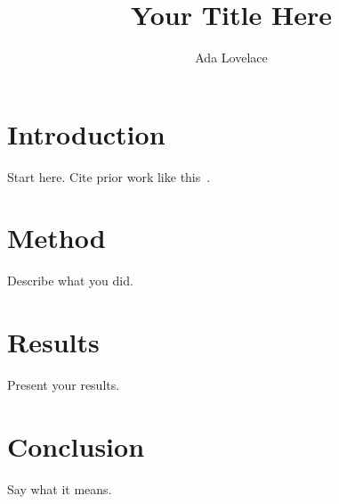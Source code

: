 \documentclass{korigamik}
\title{Your Title Here}
\author{Ada Lovelace}
\begin{document}
\maketitle

\section{Introduction}
Start here. Cite prior work like this~\cite{knuth1984texbook}.

\section{Method}
\label{sec:method}
Describe what you did.

\section{Results}
\label{sec:results}
Present your results.

\section{Conclusion}
Say what it means.



\end{document}
